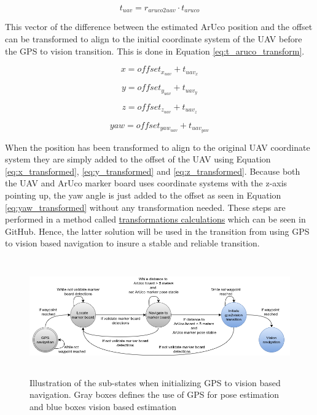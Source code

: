 \documentclass[../Head/report.tex]{subfiles}
\begin{document}
\begin{equation}
	t_{uav} = r_{aruco2uav} \cdot t_{aruco}
	\label{eq:t_aruco_transform}
\end{equation}

This vector of the difference between the estimated ArUco position and the offset can be transformed to align to the initial coordinate system of the UAV before the GPS to vision transition. This is done in Equation \ref{eq:t_aruco_transform}. 

\begin{equation}
	x = offset_{x_{uav}} + t_{uav_{x}}
	\label{eq:x_transformed}
\end{equation}

\begin{equation}
	y = offset_{y_{uav}} + t_{uav_{y}}
	\label{eq:y_transformed}
\end{equation}

\begin{equation}
	z = offset_{z_{uav}} + t_{uav_{z}}
	\label{eq:z_transformed}
\end{equation}

\begin{equation}
	yaw = offset_{yaw_{uav}} + t_{uav_{yaw}}
	\label{eq:yaw_transformed}
\end{equation}

When the position has been transformed to align to the original UAV coordinate system they are simply added to the offset of the UAV using Equation \ref{eq:x_transformed},  \ref{eq:y_transformed} and  \ref{eq:z_transformed}. Because both the UAV and ArUco marker board uses coordinate systems with the z-axis pointing up, the yaw angle is just added to the offset as seen in Equation \ref{eq:yaw_transformed} without any transformation needed. These steps are performed in a method called \href{https://github.com/Kenil16/master_project/blob/master/software/ros_workspace/src/offboard_control/transformations_calculations.py} {transformations calculations} which can be seen in GitHub. Hence, the latter solution will be used in the transition from using GPS to vision based navigation to insure a stable and reliable transition. 

\begin{figure}[H]
    \centering
    \includegraphics[height=5.0cm]{../Figures/state_machine_gps2vision_transition.png}
    \caption{Illustration of the sub-states when initializing GPS to vision based navigation. Gray boxes defines the use of GPS for pose estimation and blue boxes vision based estimation}
    \label{fig:state_machine_gps2vision_transition}
\end{figure}
\end{document}
